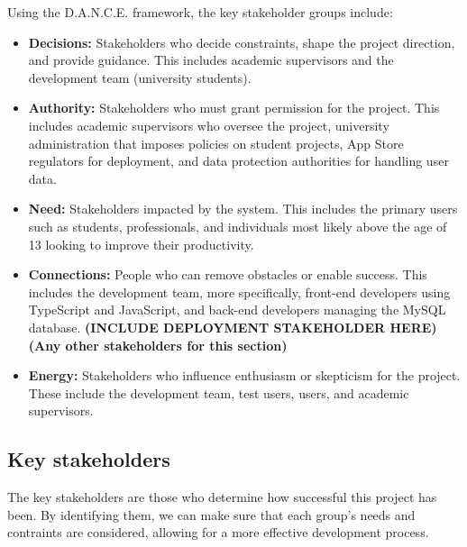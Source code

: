 Using the D.A.N.C.E. framework, the key stakeholder groups include:
\begin{itemize}
    \item \textbf{Decisions:} Stakeholders who decide constraints, shape the project direction, and provide guidance. This includes academic supervisors and the development team (university students).

    \item \textbf{Authority:} Stakeholders who must grant permission for the project. This includes academic supervisors who oversee the project, university administration that imposes policies on student projects, App Store regulators for deployment, and data protection authorities for handling user data.

    \item \textbf{Need:} Stakeholders impacted by the system. This includes the primary users such as students, professionals, and individuals most likely above the age of 13 looking to improve their productivity.

    \item \textbf{Connections:} People who can remove obstacles or enable success. This includes the development team, more specifically, front-end developers using TypeScript and JavaScript, and back-end developers managing the MySQL database. \textbf{(INCLUDE DEPLOYMENT STAKEHOLDER HERE)} \textbf{(Any other stakeholders for this section)}

    \item \textbf{Energy:} Stakeholders who influence enthusiasm or skepticism for the project. These include the development team, test users, users, and academic supervisors.
\end{itemize}

\subsection{Key stakeholders}
The key stakeholders are those who determine how successful this project has been. By identifying them, we can make sure that each group's needs and contraints are considered, allowing for a more effective development process.


